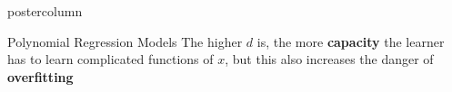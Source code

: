 \documentclass{beamer}
\begin{document}
\begin{frame}[fragile]{}
\begin{columns}
\begin{column}{.31\textwidth}
\begin{beamercolorbox}[center]{postercolumn}
\begin{minipage}{.98\textwidth}
{\begin{myblock}{Polynomial Regression Models}
  The higher $d$ is, the more \textbf{capacity} the learner has to learn complicated functions of $x$, but
  this also increases the danger of \textbf{overfitting}
  
  \vspace*{1ex}
  
  \end{myblock}
  
  
}

\end{minipage}
\end{beamercolorbox}
\end{column}

\end{columns}
\end{frame}
\end{document}
